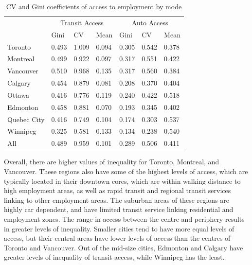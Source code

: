 \documentclass[11 pt, letterpaper]{article}
\begin{document}
{\begin{table}[H]
	\centering
	\vspace{4mm}
	\renewcommand{\arraystretch}{0.75} %
	\small
	\caption{CV and Gini coefficients of access to employment by mode}
	\vspace{2mm}
	\label{gini}
	\begin{tabular}{l|lll|lll}
		& \multicolumn{3}{c|}{Transit Access} & \multicolumn{3}{c}{Auto Access} \\
		\arrayrulecolor{lightgray}\cline{2-7}
		\arrayrulecolor{black}
		& Gini    & CV      & Mean    & Gini   & CV     & Mean  \\
		\hline
		Toronto     & 0.493 & 1.009 & 0.094 & 0.305 & 0.542 & 0.378 \\
		Montreal    & 0.499 & 0.922 & 0.097 & 0.317 & 0.551 & 0.422 \\
		Vancouver   & 0.510 & 0.968 & 0.135 & 0.317 & 0.560 & 0.384 \\
		Calgary     & 0.454 & 0.879 & 0.081 & 0.208 & 0.370 & 0.404 \\
		Ottawa      & 0.416 & 0.776 & 0.119 & 0.240 & 0.422 & 0.518 \\
		Edmonton    & 0.458 & 0.881 & 0.070 & 0.193 & 0.345 & 0.402 \\
		Quebec City & 0.416 & 0.749 & 0.104 & 0.174 & 0.303 & 0.537 \\
		Winnipeg    & 0.325 & 0.581 & 0.133 & 0.134 & 0.238 & 0.540 \\
		\hline
		All         & 0.489 & 0.959 & 0.101 & 0.289 & 0.506 & 0.411
	\end{tabular}
\end{table}

\newpage

Overall, there are higher values of inequality for Toronto, Montreal, and Vancouver. These regions also have some of the highest levels of access, which are typically located in their downtown cores, which are within walking distance to high employment areas, as well as rapid transit and regional transit services linking to other employment areas. The suburban areas of these regions are highly car dependent, and have limited transit service linking residential and employment zones. The range in access between the centre and periphery results in greater levels of inequality. Smaller cities tend to have more equal levels of access, but their central areas have lower levels of access than the centres of Toronto and Vancouver. Out of the mid-size cities, Edmonton and Calgary have greater levels of inequality of transit access, while Winnipeg has the least. 

}
\end{document}

